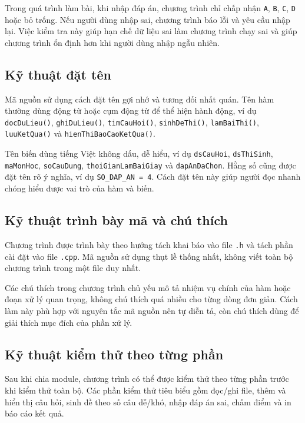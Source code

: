 \documentclass[12pt,a4paper]{report}
\begin{document}
Trong quá trình làm bài, khi nhập đáp án, chương trình chỉ chấp nhận \texttt{A}, \texttt{B}, \texttt{C}, \texttt{D} hoặc bỏ trống. Nếu người dùng nhập sai, chương trình báo lỗi và yêu cầu nhập lại. Việc kiểm tra này giúp hạn chế dữ liệu sai làm chương trình chạy sai và giúp chương trình ổn định hơn khi người dùng nhập ngẫu nhiên.

\subsection{Kỹ thuật đặt tên}

Mã nguồn sử dụng cách đặt tên gợi nhớ và tương đối nhất quán. Tên hàm thường dùng động từ hoặc cụm động từ để thể hiện hành động, ví dụ \texttt{docDuLieu()}, \texttt{ghiDuLieu()}, \texttt{timCauHoi()}, \texttt{sinhDeThi()}, \texttt{lamBaiThi()}, \texttt{luuKetQua()} và \texttt{hienThiBaoCaoKetQua()}.

Tên biến dùng tiếng Việt không dấu, dễ hiểu, ví dụ \texttt{dsCauHoi}, \texttt{dsThiSinh}, \texttt{maMonHoc}, \texttt{soCauDung}, \texttt{thoiGianLamBaiGiay} và \texttt{dapAnDaChon}. Hằng số cũng được đặt tên rõ ý nghĩa, ví dụ \texttt{SO\_DAP\_AN = 4}. Cách đặt tên này giúp người đọc nhanh chóng hiểu được vai trò của hàm và biến.

\subsection{Kỹ thuật trình bày mã và chú thích}

Chương trình được trình bày theo hướng tách khai báo vào file \texttt{.h} và tách phần cài đặt vào file \texttt{.cpp}. Mã nguồn sử dụng thụt lề thống nhất, không viết toàn bộ chương trình trong một file duy nhất.

Các chú thích trong chương trình chủ yếu mô tả nhiệm vụ chính của hàm hoặc đoạn xử lý quan trọng, không chú thích quá nhiều cho từng dòng đơn giản. Cách làm này phù hợp với nguyên tắc mã nguồn nên tự diễn tả, còn chú thích dùng để giải thích mục đích của phần xử lý.

\subsection{Kỹ thuật kiểm thử theo từng phần}

Sau khi chia module, chương trình có thể được kiểm thử theo từng phần trước khi kiểm thử toàn bộ. Các phần kiểm thử tiêu biểu gồm đọc/ghi file, thêm và hiển thị câu hỏi, sinh đề theo số câu dễ/khó, nhập đáp án sai, chấm điểm và in báo cáo kết quả.
\end{document}
